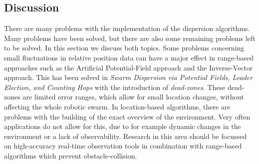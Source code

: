 \subsection{Discussion}
There are many problems with the implementation of the dispersion algorithms. 
Many problems have been solved, but there are also some remaining problems left to be solved. 
In this section we discuss both topics.
Some problems concerning small fluctuations in relative position data can have a major effect in range-based approaches such as the Artificial Potential-Field approach and the Inverse-Vector approach. 
This has been solved in \emph{Swarm Dispersion via Potential Fields, Leader Election, and Counting Hops} with the introduction of \emph{dead-zones}. 
These dead-zones are limited error ranges, which allow for small location changes, without affecting the whole robotic swarm.
In location-based algorithms, there are problems with the building of the exact overview of the environment. 
Very often applications do not allow for this, due to for example dynamic changes in the environment or a lack of observability. 
Research in this area should be focussed on high-accuracy real-time observation tools in combination with range-based algorithms which prevent obstacle-collision. 